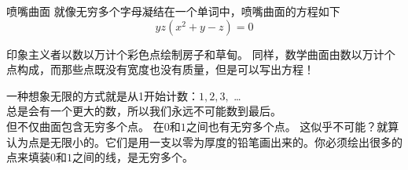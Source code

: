 ﻿\begin{surferPage}{喷嘴曲面}
就像无穷多个字母凝结在一个单词中，喷嘴曲面的方程如下\\
\smallskip
\[y z (x^2	+ y - z)	= 0\]

\vspace{0.3cm}

印象主义者以数以万计个彩色点绘制房子和草甸。 同样，数学曲面由数以万计个点构成，而那些点既没有宽度也没有质量，但是可以写出方程！\\

\vspace{0.3cm}

一种想象无限的方式就是从1开始计数：$1, 2, 3,$ \dots\\
总是会有一个更大的数，所以我们永远不可能数到最后。\\

\vspace{0.3cm}
但不仅曲面包含无穷多个点。 在$0$和$1$之间也有无穷多个点。 这似乎不可能？就算认为点是无限小的。它们是用一支以零为厚度的铅笔画出来的。你必须绘出很多的点来填装$0$和$1$之间的线，是无穷多个。
\end{surferPage}
